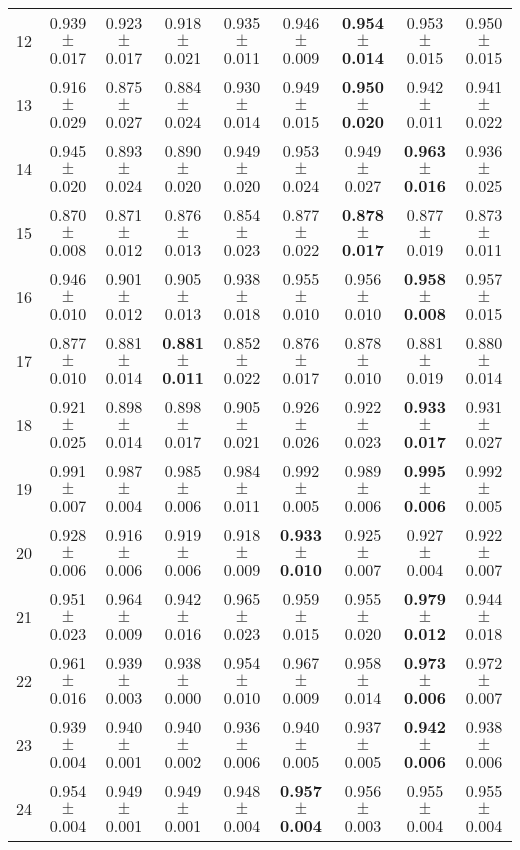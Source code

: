 \begin{table}[!ht]
{\begin{tabular}{r c c c c c c c c}
12 & 0.939 $\pm$ 0.017 & 0.923 $\pm$ 0.017 & 0.918 $\pm$ 0.021 & 0.935 $\pm$ 0.011 & 0.946 $\pm$ 0.009 & \textbf{0.954 $\pm$ 0.014} & 0.953 $\pm$ 0.015 & 0.950 $\pm$ 0.015 \\
13 & 0.916 $\pm$ 0.029 & 0.875 $\pm$ 0.027 & 0.884 $\pm$ 0.024 & 0.930 $\pm$ 0.014 & 0.949 $\pm$ 0.015 & \textbf{0.950 $\pm$ 0.020} & 0.942 $\pm$ 0.011 & 0.941 $\pm$ 0.022 \\
14 & 0.945 $\pm$ 0.020 & 0.893 $\pm$ 0.024 & 0.890 $\pm$ 0.020 & 0.949 $\pm$ 0.020 & 0.953 $\pm$ 0.024 & 0.949 $\pm$ 0.027 & \textbf{0.963 $\pm$ 0.016} & 0.936 $\pm$ 0.025 \\
15 & 0.870 $\pm$ 0.008 & 0.871 $\pm$ 0.012 & 0.876 $\pm$ 0.013 & 0.854 $\pm$ 0.023 & 0.877 $\pm$ 0.022 & \textbf{0.878 $\pm$ 0.017} & 0.877 $\pm$ 0.019 & 0.873 $\pm$ 0.011 \\
16 & 0.946 $\pm$ 0.010 & 0.901 $\pm$ 0.012 & 0.905 $\pm$ 0.013 & 0.938 $\pm$ 0.018 & 0.955 $\pm$ 0.010 & 0.956 $\pm$ 0.010 & \textbf{0.958 $\pm$ 0.008} & 0.957 $\pm$ 0.015 \\
17 & 0.877 $\pm$ 0.010 & 0.881 $\pm$ 0.014 & \textbf{0.881 $\pm$ 0.011} & 0.852 $\pm$ 0.022 & 0.876 $\pm$ 0.017 & 0.878 $\pm$ 0.010 & 0.881 $\pm$ 0.019 & 0.880 $\pm$ 0.014 \\
18 & 0.921 $\pm$ 0.025 & 0.898 $\pm$ 0.014 & 0.898 $\pm$ 0.017 & 0.905 $\pm$ 0.021 & 0.926 $\pm$ 0.026 & 0.922 $\pm$ 0.023 & \textbf{0.933 $\pm$ 0.017} & 0.931 $\pm$ 0.027 \\
19 & 0.991 $\pm$ 0.007 & 0.987 $\pm$ 0.004 & 0.985 $\pm$ 0.006 & 0.984 $\pm$ 0.011 & 0.992 $\pm$ 0.005 & 0.989 $\pm$ 0.006 & \textbf{0.995 $\pm$ 0.006} & 0.992 $\pm$ 0.005 \\
20 & 0.928 $\pm$ 0.006 & 0.916 $\pm$ 0.006 & 0.919 $\pm$ 0.006 & 0.918 $\pm$ 0.009 & \textbf{0.933 $\pm$ 0.010} & 0.925 $\pm$ 0.007 & 0.927 $\pm$ 0.004 & 0.922 $\pm$ 0.007 \\
21 & 0.951 $\pm$ 0.023 & 0.964 $\pm$ 0.009 & 0.942 $\pm$ 0.016 & 0.965 $\pm$ 0.023 & 0.959 $\pm$ 0.015 & 0.955 $\pm$ 0.020 & \textbf{0.979 $\pm$ 0.012} & 0.944 $\pm$ 0.018 \\
22 & 0.961 $\pm$ 0.016 & 0.939 $\pm$ 0.003 & 0.938 $\pm$ 0.000 & 0.954 $\pm$ 0.010 & 0.967 $\pm$ 0.009 & 0.958 $\pm$ 0.014 & \textbf{0.973 $\pm$ 0.006} & 0.972 $\pm$ 0.007 \\
23 & 0.939 $\pm$ 0.004 & 0.940 $\pm$ 0.001 & 0.940 $\pm$ 0.002 & 0.936 $\pm$ 0.006 & 0.940 $\pm$ 0.005 & 0.937 $\pm$ 0.005 & \textbf{0.942 $\pm$ 0.006} & 0.938 $\pm$ 0.006 \\
24 & 0.954 $\pm$ 0.004 & 0.949 $\pm$ 0.001 & 0.949 $\pm$ 0.001 & 0.948 $\pm$ 0.004 & \textbf{0.957 $\pm$ 0.004} & 0.956 $\pm$ 0.003 & 0.955 $\pm$ 0.004 & 0.955 $\pm$ 0.004 \\

\end{tabular}}
\end{table}
